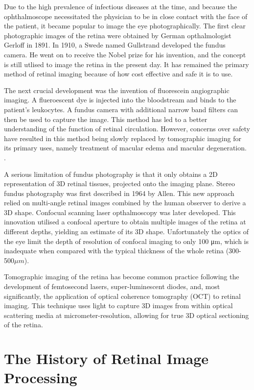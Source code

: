 Due to the high prevalence of infectious diseases at the time, and because the ophthalmoscope necessitated the physician to be in close contact with the face of the patient, it became popular to image the eye photographically.  The first clear photographic images of the retina were obtained by German opthalmologist Gerloff in 1891.\cite{gerloffphoto}  In 1910, a Swede named Gullstrand developed the fundus camera.  He went on to receive the Nobel prize for his invention, and the concept is still utlised to image the retina in the present day.\cite{gullstrandcamera}  It has remained the primary method of retinal imaging because of how cost effective and safe it is to use.  

The next crucial development was the invention of fluorescein angiographic imaging.  A flueroescent dye is injected into the bloodstream and binds to the patient's leukocytes.\cite{novotny1961method}  A fundus camera with additional narrow band filters can then be used to capture the image.  This method has led to a better understanding of the function of retinal circulation.  However, concerns over safety have resulted in this method being slowly replaced by tomographic imaging for its primary uses, namely treatment of macular edema and macular degeneration. .

A serious limitation of fundus photography is that it only obtains a 2D representation of 3D retinal tissues, projected onto the imaging plane.  Stereo fundus photography was first described in 1964 by Allen.\cite{allen1964ocular}  This new approach relied on multi-angle retinal images combined by the human observer to derive a 3D shape.  Confocual scanning laser opthalmoscopy was later developed.  This innovation utilised a confocal aperture to obtain multiple images of the retina at different depths, yielding an estimate of its 3D shape.  Unfortunately the optics of the eye limit the depth of resolution of confocal imaging to only 100 μm, which is inadequate when compared with the typical thickness of the whole retina (300-500$\mu m$).\cite{webb1987confocal}

Tomographic imaging of the retina has become common practice following the development of femtosecond lasers, super-luminescent diodes, and, most significantly, the application of optical coherence tomography (OCT) to retinal imaging.\cite{huang1991optical}  This technique uses light to capture 3D images from within optical scattering media at micrometer-resolution, allowing for true 3D optical sectioning of the retina.\cite{van2007recent}
\section{The History of Retinal Image Processing}


